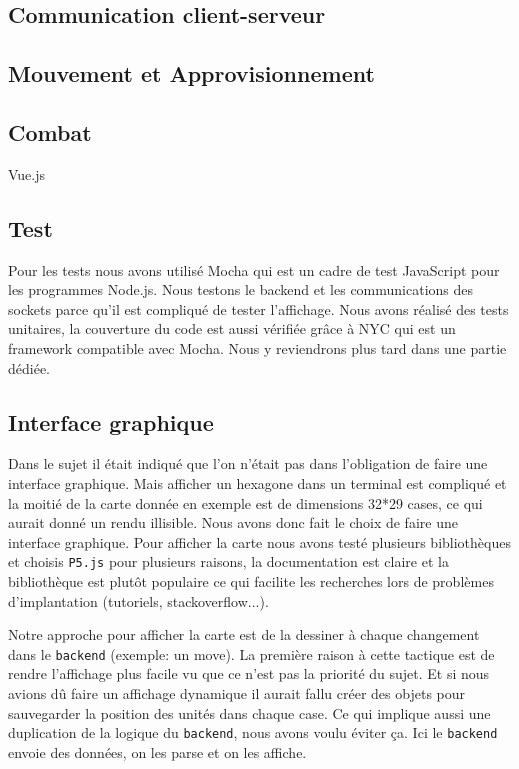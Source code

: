 \subsection{Communication client-serveur}



\subsection{Mouvement et Approvisionnement}

\subsection{Combat}



Vue.js

\subsection{Test}

Pour les tests nous avons utilisé Mocha qui est un cadre de test JavaScript pour les programmes Node.js. Nous testons le backend et les communications des sockets parce qu'il est compliqué de tester l'affichage. Nous avons réalisé des tests unitaires, la couverture du code est aussi vérifiée grâce à NYC qui est un framework compatible avec Mocha. Nous y reviendrons plus tard dans une partie dédiée.

\subsection{Interface graphique}

Dans le sujet il était indiqué que l'on n'était pas dans l'obligation de faire une interface graphique. Mais afficher un hexagone dans un terminal est compliqué et la moitié de la carte donnée en exemple est de dimensions 32*29 cases, ce qui aurait donné un rendu illisible. Nous avons donc fait le choix de faire une interface graphique. Pour afficher la carte nous avons testé plusieurs bibliothèques et choisis \lstinline{P5.js} pour plusieurs raisons, la documentation est claire et la bibliothèque est plutôt populaire ce qui facilite les recherches lors de problèmes d'implantation (tutoriels, stackoverflow...).

Notre approche pour afficher la carte est de la dessiner à chaque changement dans le \lstinline{backend} (exemple: un move). La première raison à cette tactique est de rendre l'affichage plus facile vu que ce n'est pas la priorité du sujet. Et si nous avions dû faire un affichage dynamique il aurait fallu créer des objets pour sauvegarder la position des unités dans chaque case. Ce qui implique aussi une duplication de la logique du \lstinline{backend}, nous avons voulu éviter ça. Ici le \lstinline{backend} envoie des données, on les parse et on les affiche.

